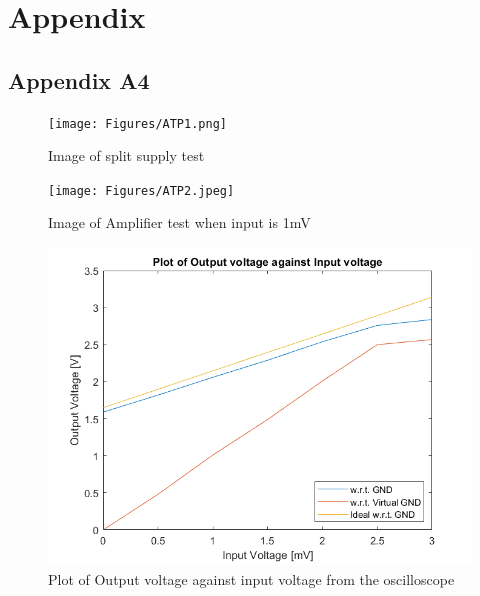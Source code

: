 \documentclass[class=report,11pt,crop=false]{standalone}
\begin{document}
	\chapter{Appendix}
	\section{Appendix A4}
	\begin{figure}[h!]
		\centering
		\texttt{[image: Figures/ATP1.png]}
		\caption{Image of split supply test}
		\label{fig:S7}
	\end{figure}
	\begin{figure}[h!]
		\centering
		\texttt{[image: Figures/ATP2.jpeg]}
		\caption{Image of Amplifier test when input is 1mV}
		\label{fig:S8}
	\end{figure}
	\begin{figure}[h!]
		\centering
		\includegraphics[width=0.4\linewidth]{Figures/Result1.png}
		\caption{Plot of Output voltage against input voltage from the oscilloscope}
		\label{fig:S11}
	\end{figure}
	\ifstandalone
	
	\printnoidxglossary[type=\acronymtype,nonumberlist]
	\fi
\end{document}
